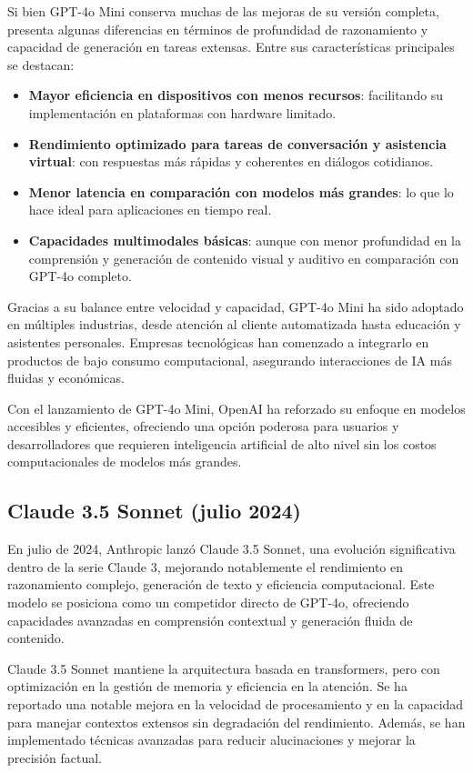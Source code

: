 Si bien GPT-4o Mini conserva muchas de las mejoras de su versión completa, presenta algunas diferencias en términos de profundidad de razonamiento y capacidad de generación en tareas extensas. 
Entre sus características principales se destacan:
\begin{itemize}
    \item \textbf{Mayor eficiencia en dispositivos con menos recursos}: facilitando su implementación en plataformas con hardware limitado.
    \item \textbf{Rendimiento optimizado para tareas de conversación y asistencia virtual}: con respuestas más rápidas y coherentes en diálogos cotidianos.
    \item \textbf{Menor latencia en comparación con modelos más grandes}: lo que lo hace ideal para aplicaciones en tiempo real.
    \item \textbf{Capacidades multimodales básicas}: aunque con menor profundidad en la comprensión y generación de contenido visual y auditivo en comparación con GPT-4o completo.
\end{itemize}

Gracias a su balance entre velocidad y capacidad, GPT-4o Mini ha sido adoptado en múltiples industrias, desde atención al cliente automatizada hasta educación y asistentes personales. 
Empresas tecnológicas han comenzado a integrarlo en productos de bajo consumo computacional, asegurando interacciones de IA más fluidas y económicas.

Con el lanzamiento de GPT-4o Mini, OpenAI ha reforzado su enfoque en modelos accesibles y eficientes, ofreciendo una opción poderosa para usuarios y desarrolladores que requieren inteligencia artificial de alto nivel sin los costos computacionales de modelos más grandes. 


\subsection{Claude 3.5 Sonnet (julio 2024)}

En julio de 2024, Anthropic lanzó Claude 3.5 Sonnet, una evolución significativa dentro de la serie Claude 3, mejorando notablemente el rendimiento en razonamiento complejo, generación de texto y eficiencia computacional. 
Este modelo se posiciona como un competidor directo de GPT-4o, ofreciendo capacidades avanzadas en comprensión contextual y generación fluida de contenido.

Claude 3.5 Sonnet mantiene la arquitectura basada en transformers, pero con optimización en la gestión de memoria y eficiencia en la atención. 
Se ha reportado una notable mejora en la velocidad de procesamiento y en la capacidad para manejar contextos extensos sin degradación del rendimiento. 
Además, se han implementado técnicas avanzadas para reducir alucinaciones y mejorar la precisión factual.

